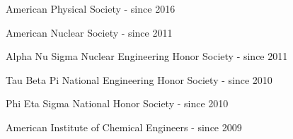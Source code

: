 \begin{list1}
\item[] American Physical Society  \hfill{ - since 2016}
\item[] American Nuclear Society  \hfill{ - since 2011}
\item[] Alpha Nu Sigma Nuclear Engineering Honor Society \hfill{- since 2011}
\item[] Tau Beta Pi National Engineering Honor Society \hfill{- since 2010}
\item[] Phi Eta Sigma National Honor Society \hfill{- since 2010}
\item[] American Institute of Chemical Engineers \hfill{- since 2009}
\end{list1}